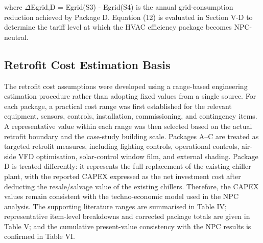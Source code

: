 \documentclass[journal,fleqn]{IEEEtran}
\begin{document}
where $\Delta$Egrid,D = Egrid(S3) - Egrid(S4) is the annual grid-consumption reduction achieved by Package D. Equation (12) is evaluated in Section V-D to determine the tariff level at which the HVAC efficiency package becomes NPC-neutral.


\subsection{Retrofit Cost Estimation Basis}

The retrofit cost assumptions were developed using a range-based engineering estimation procedure rather than adopting fixed values from a single source. For each package, a practical cost range was first established for the relevant equipment, sensors, controls, installation, commissioning, and contingency items. A representative value within each range was then selected based on the actual retrofit boundary and the case-study building scale. Packages A--C are treated as targeted retrofit measures, including lighting controls, operational controls, air-side VFD optimisation, solar-control window film, and external shading. Package D is treated differently: it represents the full replacement of the existing chiller plant, with the reported CAPEX expressed as the net investment cost after deducting the resale/salvage value of the existing chillers. Therefore, the CAPEX values remain consistent with the techno-economic model used in the NPC analysis. The supporting literature ranges are summarised in Table IV; representative item-level breakdowns and corrected package totals are given in Table V; and the cumulative present-value consistency with the NPC results is confirmed in Table VI.
\end{document}

